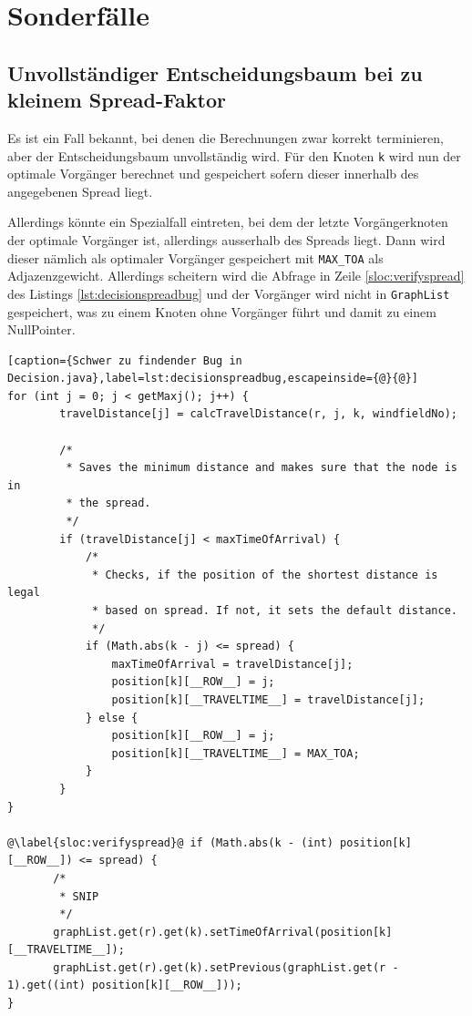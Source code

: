 \section{Sonderfälle}
\subsection{Unvollständiger Entscheidungsbaum bei zu kleinem Spread-Faktor}
Es ist ein Fall bekannt, bei denen die Berechnungen zwar korrekt terminieren,
aber der Entscheidungsbaum unvollständig wird. Für den Knoten \texttt{k} wird
nun der optimale Vorgänger berechnet und gespeichert sofern dieser innerhalb
des angegebenen Spread liegt.

Allerdings könnte ein Spezialfall eintreten, bei dem der letzte
Vorgängerknoten der optimale Vorgänger ist, allerdings ausserhalb des Spreads
liegt. Dann wird dieser nämlich als optimaler Vorgänger gespeichert mit
\texttt{MAX\_TOA} als Adjazenzgewicht. Allerdings scheitern wird die Abfrage
in Zeile \ref{sloc:verifyspread} des Listings \ref{lst:decisionspreadbug} und
der Vorgänger wird nicht in \texttt{GraphList} gespeichert, was zu einem
Knoten ohne Vorgänger führt und damit zu einem NullPointer.

\begin{lstlisting}[caption={Schwer zu findender Bug in
Decision.java},label=lst:decisionspreadbug,escapeinside={@}{@}]
for (int j = 0; j < getMaxj(); j++) {
        travelDistance[j] = calcTravelDistance(r, j, k, windfieldNo);
        
        /*
         * Saves the minimum distance and makes sure that the node is in
         * the spread.
         */
        if (travelDistance[j] < maxTimeOfArrival) {
        	/*
        	 * Checks, if the position of the shortest distance is legal
        	 * based on spread. If not, it sets the default distance.
        	 */
        	if (Math.abs(k - j) <= spread) {
        		maxTimeOfArrival = travelDistance[j];
        		position[k][__ROW__] = j;
        		position[k][__TRAVELTIME__] = travelDistance[j];
        	} else {
        		position[k][__ROW__] = j;
        		position[k][__TRAVELTIME__] = MAX_TOA;
        	}
        }
}

@\label{sloc:verifyspread}@ if (Math.abs(k - (int) position[k][__ROW__]) <= spread) {
       /*
        * SNIP
        */
       graphList.get(r).get(k).setTimeOfArrival(position[k][__TRAVELTIME__]);
       graphList.get(r).get(k).setPrevious(graphList.get(r - 1).get((int) position[k][__ROW__]));
}

\end{lstlisting}

